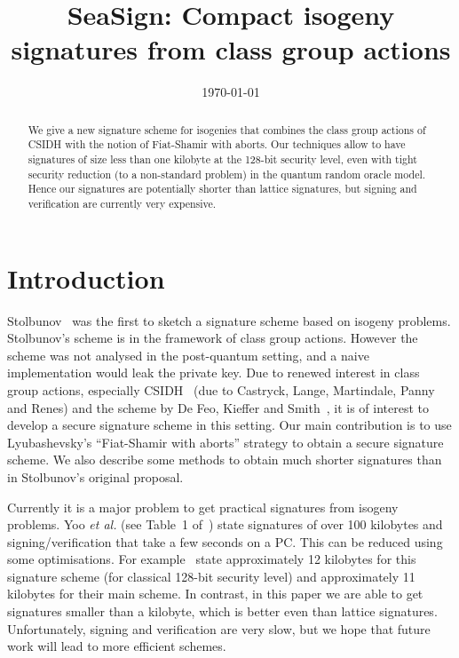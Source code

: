 \documentclass{llncs}
\title{SeaSign: Compact isogeny signatures from class group actions}
\date{\today}
\begin{document}
\pagestyle{plain}

\maketitle


\begin{abstract}
We give a new signature scheme for isogenies that combines the class group actions of CSIDH with the notion of Fiat-Shamir with aborts.
Our techniques allow to have signatures of size less than one kilobyte at the 128-bit security level, even with tight security reduction (to a non-standard problem) in the quantum random oracle model.
Hence our signatures are potentially shorter than lattice signatures, but signing and verification are currently very expensive.
\end{abstract}



\section{Introduction}

Stolbunov~\cite{Sto12} was the first to sketch a signature scheme based on isogeny problems.
Stolbunov's scheme is in the framework of class group actions.
However the scheme was not analysed in the post-quantum setting, and a naive implementation would leak the private key.
Due to renewed interest in class group actions, especially CSIDH~\cite{CLMPR18} (due to Castryck, Lange, Martindale, Panny and Renes) and the scheme by De Feo, Kieffer and Smith~\cite{DFKS18}, it is of interest to develop a secure signature scheme in this setting.
Our main contribution is to use Lyubashevsky's ``Fiat-Shamir with aborts'' strategy to obtain a secure signature scheme.
We also describe some methods to obtain much shorter signatures than in Stolbunov's original proposal.




Currently it is a major problem to get practical signatures from isogeny problems.
Yoo \emph{et al.} (see Table~1 of~\cite{YAJJS17}) state signatures of over 100 kilobytes
and signing/verification that take a few seconds on a PC.
This can be reduced using some optimisations. For example~\cite{GPS17} state approximately 12 kilobytes for this signature scheme (for classical 128-bit security level) and approximately 11 kilobytes for their main scheme.
In contrast, in this paper we are able to get signatures smaller than a kilobyte, which is better even than lattice signatures.
Unfortunately, signing and verification are very slow, but we 
hope that future work will lead to more efficient schemes.
\end{document}
